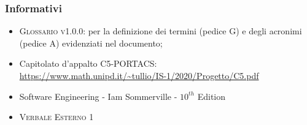 \subsubsection{Informativi}
\begin{itemize}
\item \textsc{Glossario v1.0.0}: per la definizione dei termini (pedice G) e degli acronimi (pedice A) evidenziati nel documento;
\item Capitolato d'appalto C5-PORTACS: \\
{\url{https://www.math.unipd.it/~tullio/IS-1/2020/Progetto/C5.pdf}}
\item Software Engineering - Iam Sommerville - $10^{th}$ Edition
\item \textsc{Verbale Esterno 1}
 

\end{itemize}